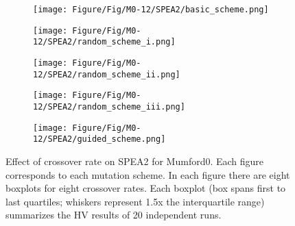 \begin{figure}[!htbp]
	\centering
	\begin{subfigure}[b]{0.52\textwidth}
		\texttt{[image: Figure/Fig/M0-12/SPEA2/basic\_scheme.png]}
	\end{subfigure}%
	\begin{subfigure}[b]{0.52\textwidth}
		\texttt{[image: Figure/Fig/M0-12/SPEA2/random\_scheme\_i.png]}
	\end{subfigure}%
	\newline
	\begin{subfigure}[b]{0.52\textwidth}
		\texttt{[image: Figure/Fig/M0-12/SPEA2/random\_scheme\_ii.png]}
	\end{subfigure}%
	\begin{subfigure}[b]{0.52\textwidth}
		\texttt{[image: Figure/Fig/M0-12/SPEA2/random\_scheme\_iii.png]}
	\end{subfigure}%
	\newline
	\begin{subfigure}[b]{0.52\textwidth}
		\texttt{[image: Figure/Fig/M0-12/SPEA2/guided\_scheme.png]}
	\end{subfigure}%
	\caption{Effect of crossover rate on SPEA2 for Mumford0. Each figure corresponds to each mutation scheme. In each figure there are eight boxplots for eight crossover rates.  Each boxplot (box spans first to last quartiles; whiskers represent 1.5x the interquartile range) summarizes the HV results of 20 independent runs.}
	\label{fig:cr_m0_spea2}
\end{figure}

